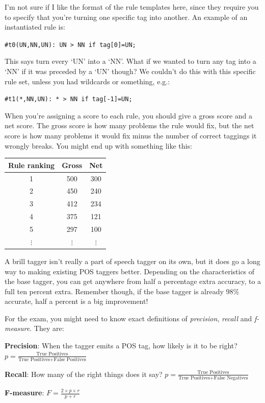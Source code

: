 \begin{description}
  I'm not sure if I like the format of the rule templates here, since they
  require you to specify that you're turning one specific tag into another. An
  example of an instantiated rule is:

  \texttt{\#t0(UN,NN,UN): UN > NN if tag[0]=UN;}

  This says turn every `UN' into a `NN'. What if we wanted to turn any tag into
  a `NN' if it was preceded by a `UN' though? We couldn't do this with this
  specific rule set, unless you had wildcards or something, e.g.:

  \texttt{\#t1(*,NN,UN): * > NN if tag[-1]=UN;}

  When you're assigning a score to each rule, you should give a gross score and
  a net score. The gross score is how many problems the rule would fix, but the
  net score is how many problems it would fix minus the number of correct
  taggings it wrongly breaks. You might end up with something like this:

  \begin{center}
    \begin{tabular} {|c|c|c|}
      \hline
      Rule ranking & Gross & Net\\ \hline
      1 & 500 & 300\\ \hline
      2 & 450 & 240\\ \hline
      3 & 412 & 234\\ \hline
      4 & 375 & 121\\ \hline
      5 & 297 & 100\\ \hline
      $\vdots$ & $\vdots$ & $\vdots$\\ 
    \end{tabular}
  \end{center}

  A brill tagger isn't really a part of speech tagger on its own, but it does go
  a long way to making existing POS taggers better. Depending on the
  characteristics of the base tagger, you can get anywhere from half a
  percentage extra accuracy, to a full ten percent extra. Remember though, if
  the base tagger is already 98\% accurate, half a percent is a big improvement!
\end{description}

For the exam, you might need to know exact definitions of \textit{precision},
\textit{recall} and \textit{f-measure}. They are:

\begin{description}
	\item \textbf{Precision}: When the tagger emits a POS tag, how likely is it
	to be right? $p = \frac{\text{True Positives}}{\text{True Positives} +
  \text{False Positives}}$
	\item \textbf{Recall}: How many of the right things does it say?  $p =
  \frac{\text{True Positives}}{\text{True Positives} + \text{False Negatives}}$
	\item \textbf{F-measure}: $F = \frac{2 \times p \times r}{p + r}$
\end{description}

